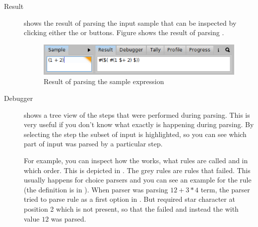 \documentclass[a4paper,10pt,twoside]{book}
\begin{document}
\begin{description}

\item[Result] shows the result of parsing the input sample  that can be inspected by
  clicking either the  or  buttons. Figure
   shows the result of parsing .

  \begin{figure}[ht]
    \begin{center}
      \includegraphics[width=.7\linewidth]{PPBrowserResult}
      \caption{Result of parsing the  sample expression \label{fig:pp/browserResult}}
    \end{center}
  \end{figure}

\item[Debugger] shows a tree view of the steps that were performed
  during parsing. This is very useful if you don't know what exactly
  is happening during parsing. By selecting the step the subset of
  input is highlighted, so you can see which part of input was parsed
  by a particular step. 

  For example, you can inspect how the  works, 
    what rules are called and in which order.
  This is depicted in . 
  The grey rules are rules that failed. 
  This usually happens for choice parsers and you can see an example for the  rule 
    (the definition is in ). 
  When parser was parsing $12 + 3 * 4$ term, the parser tried to parse  rule 
    as a first option in .
  But  required star character  at position 2 which is not present, so that the 
     failed and instead the  with value $12$ was parsed.




\end{description}
\end{document}

